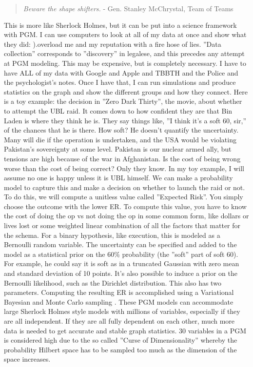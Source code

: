 \documentclass{article}
\begin{document}
\begin{multicols}{2}
\begin{quote}
\emph{Beware the shape shifters.}
  - Gen. Stanley McChrystal, Team of Teams \cite{teamofteams}
\end{quote}

This is more like Sherlock Holmes, but it can be put into a science framework with PGM. I can use computers to look at all of my data at once and show what they did: ).overload me and my reputation with a fire hose of lies. ''Data collection'' corresponds to ''discovery'' in legalese, and this precedes any attempt at PGM modeling. This may be expensive, but is completely necessary. I have to have ALL of my data with Google and Apple and TBBTH and the Police and the psychologist's notes. Once I have that, I can run simulations and produce statistics on the graph and show the different groups and how they connect. Here is a toy example: the decision in ''Zero Dark Thirty'', the movie, about whether to attempt the UBL raid. It comes down to how confident they are that Bin Laden is where they think he is. They say things like, ''I think it's a soft 60, sir,'' of the chances that he is there. How soft? He doesn't quantify the uncertainty. Many will die if the operation is undertaken, and the USA would be violating Pakistan's sovereignty at some level. Pakistan is our nuclear armed ally, but tensions are high because of the war in Afghanistan. Is the cost of being wrong worse than the cost of being correct? Only they know. In my toy example, I will assume no one is happy unless it is UBL himself. We can make a probability model to capture this and make a decision on whether to launch the raid or not. To do this, we will compute a unitless value called ''Expected Risk''. You simply choose the outcome with the lower ER. To compute this value, you have to know the cost of doing the op vs not doing the op in some common form, like dollars or lives lost or some weighted linear combination of all the factors that matter for the schema. For a binary hypothesis, like execution, this is modeled as a Bernoulli random variable. The uncertainty can be specified and added to the model as a statistical prior on the 60\% probability (the ''soft'' part of soft 60). For example, he could say it is soft as in a truncated Gaussian with zero mean and standard deviation of 10 points. It's also possible to induce a prior on the Bernoulli likelihood, such as the Dirichlet distribution. This also has two parameters. Computing the resulting ER is accomplished using a Variational Bayesian \cite{variational} and Monte Carlo sampling \cite{mcmc}. These PGM models can accommodate large Sherlock Holmes style models with millions of variables, especially if they are all independent. If they are all fully dependent on each other, much more data is needed to get accurate and stable graph statistics. 30 variables in a PGM is considered high due to the so called ''Curse of Dimensionality'' whereby the probability Hilbert space has to be sampled too much as the dimension of the space increases.


\end{multicols}
\end{document}
